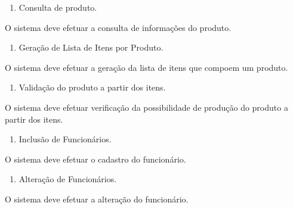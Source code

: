\liststyleWWNumi
\setcounter{saveenum}{\value{enumi}}
\begin{enumerate}
\setcounter{enumi}{\value{saveenum}}
\item {
\textcolor[rgb]{0.078431375,0.09411765,0.13725491}{Consulta de produto.}}
\end{enumerate}
{
\textcolor[rgb]{0.078431375,0.09411765,0.13725491}{O sistema deve efetuar a consulta de informações do produto.}}

\liststyleWWNumi
\setcounter{saveenum}{\value{enumi}}
\begin{enumerate}
\setcounter{enumi}{\value{saveenum}}
\item {
\textcolor[rgb]{0.078431375,0.09411765,0.13725491}{Geração de Lista de Itens por Produto.}}
\end{enumerate}
{
\textcolor[rgb]{0.078431375,0.09411765,0.13725491}{O sistema deve efetuar a geração da lista de itens que compoem um
produto.}}

\liststyleWWNumi
\setcounter{saveenum}{\value{enumi}}
\begin{enumerate}
\setcounter{enumi}{\value{saveenum}}
\item {
\textcolor[rgb]{0.078431375,0.09411765,0.13725491}{Validação do produto a partir dos itens.}}
\end{enumerate}
{
\textcolor[rgb]{0.078431375,0.09411765,0.13725491}{O sistema deve efetuar verificação da possibilidade de produção do
produto a partir dos itens.}}


\bigskip


\bigskip

\liststyleWWNumi
\setcounter{saveenum}{\value{enumi}}
\begin{enumerate}
\setcounter{enumi}{\value{saveenum}}
\item {
\textcolor[rgb]{0.078431375,0.09411765,0.13725491}{Inclusão de Funcionários.}}
\end{enumerate}
{
\textcolor[rgb]{0.078431375,0.09411765,0.13725491}{O sistema deve efetuar o cadastro do funcionário.}}

\liststyleWWNumi
\setcounter{saveenum}{\value{enumi}}
\begin{enumerate}
\setcounter{enumi}{\value{saveenum}}
\item {
\textcolor[rgb]{0.078431375,0.09411765,0.13725491}{Alteração de Funcionários.}}
\end{enumerate}
{
\textcolor[rgb]{0.078431375,0.09411765,0.13725491}{O sistema deve efetuar a alteração do funcionário.}}

